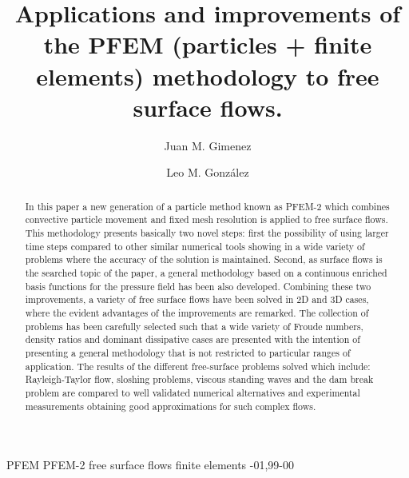 \documentclass[review]{elsarticle}
\begin{document}
\begin{frontmatter}

\title{Applications and improvements of the PFEM (particles + finite elements) methodology to free surface flows.}

\author{Juan M. Gimenez}
\address{CIMEC, Santa Fe, Argentina}
\author{Leo M. Gonz\'{a}lez}
\address{UPM, Madrid, Spain}

%
%
%

\begin{abstract}
In this paper a new generation of a particle method known as PFEM-2 which combines convective particle movement and fixed mesh resolution is applied to free surface flows. This methodology presents basically two novel steps: first the possibility of using larger time steps compared to other similar numerical tools showing in a wide variety of problems where the accuracy of the solution is maintained. Second, as surface flows is the searched topic of the paper, a general methodology based on a continuous enriched basis functions for the pressure field has been also developed. Combining these two improvements, a variety of free surface flows have been solved in 2D and 3D cases, where the evident advantages of the improvements are remarked. The collection of problems has been carefully selected such that a wide variety of Froude numbers, density ratios and dominant dissipative cases are presented with the intention of presenting a general methodology that is not restricted to particular ranges of application. 
The results of the different free-surface problems solved which include: Rayleigh-Taylor flow, sloshing problems, viscous standing waves and the dam break problem are compared to well validated numerical alternatives and experimental measurements obtaining
good approximations for such complex flows. 
\end{abstract}

\begin{keyword}
PFEM PFEM-2 free surface flows finite elements
-01\sep  99-00
\end{keyword}

\end{frontmatter}
\end{document}

